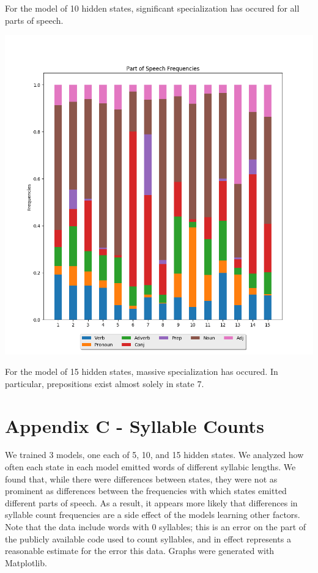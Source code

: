 For the model of 10 hidden states, significant specialization has occured for all parts of speech.

\begin{center}
\includegraphics[scale=0.6]{../src/results/parts_of_speech_15}
\end{center}

For the model of 15 hidden states, massive specialization has occured. In particular, prepositions exist almost solely in state 7.

\pagebreak
\section{Appendix C - Syllable Counts}
We trained 3 models, one each of 5, 10, and 15 hidden states. We analyzed how often each state in each model emitted words of different syllabic lengths. We found that, while there were differences between states, they were not as prominent as differences between the frequencies with which states emitted different parts of speech. As a result, it appears more likely that differences in syllable count frequencies are a side effect of the models learning other factors. Note that the data include words with 0 syllables; this is an error on the part of the publicly available code used to count syllables, and in effect represents a reasonable estimate for the error this data. Graphs were generated with Matplotlib.

